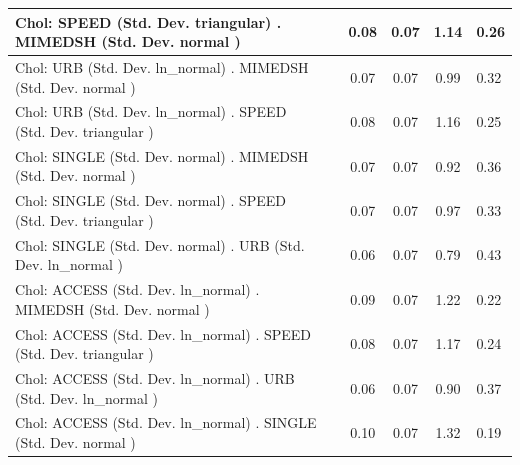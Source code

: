 \begin{table}
\begin{center}
\begin{tabular}{|l|l|c|c|c|l|}
			\hline
			 Chol: SPEED (Std. Dev. triangular) . MIMEDSH (Std. Dev.   normal ) &  & 0.08 & 0.07 & 1.14 & 0.26 \\
			\hline
			 Chol: URB (Std. Dev. ln_normal) . MIMEDSH (Std. Dev.   normal ) &  & 0.07 & 0.07 & 0.99 & 0.32 \\
			\hline
			 Chol: URB (Std. Dev. ln_normal) . SPEED (Std. Dev.   triangular ) &  & 0.08 & 0.07 & 1.16 & 0.25 \\
			\hline
			 Chol: SINGLE (Std. Dev. normal) . MIMEDSH (Std. Dev.   normal ) &  & 0.07 & 0.07 & 0.92 & 0.36 \\
			\hline
			 Chol: SINGLE (Std. Dev. normal) . SPEED (Std. Dev.   triangular ) &  & 0.07 & 0.07 & 0.97 & 0.33 \\
			\hline
			 Chol: SINGLE (Std. Dev. normal) . URB (Std. Dev.   ln_normal ) &  & 0.06 & 0.07 & 0.79 & 0.43 \\
			\hline
			 Chol: ACCESS (Std. Dev. ln_normal) . MIMEDSH (Std. Dev.   normal ) &  & 0.09 & 0.07 & 1.22 & 0.22 \\
			\hline
			 Chol: ACCESS (Std. Dev. ln_normal) . SPEED (Std. Dev.   triangular ) &  & 0.08 & 0.07 & 1.17 & 0.24 \\
			\hline
			 Chol: ACCESS (Std. Dev. ln_normal) . URB (Std. Dev.   ln_normal ) &  & 0.06 & 0.07 & 0.90 & 0.37 \\
			\hline
			 Chol: ACCESS (Std. Dev. ln_normal) . SINGLE (Std. Dev.   normal ) &  & 0.10 & 0.07 & 1.32 & 0.19 \\
			\hline
		\end{tabular}
	\end{center}
\end{table}